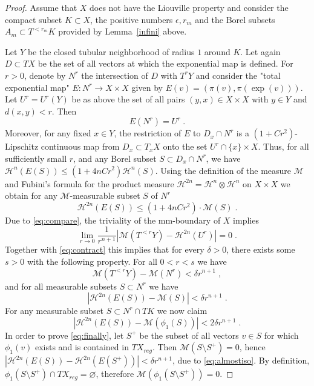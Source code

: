 \documentclass[12pt,leqno,intlimits]{amsart}
\numberwithin{equation}{section}
\theoremstyle{definition}
\theoremstyle{remark}
\newcommand{\lref}[1]{Lemma~\ref{#1}}
\def\:{\colon}
\def\emptyset{\varnothing}
\begin{document}
\begin{proof}
Assume that $X$ does not have the Liouville property and consider the compact subset $K \subset X$, the positive numbers $\epsilon, r_m$ and the Borel
subsets $A_m\subset T^{<r_m} K$ provided by \lref{infini} above.

Let $Y$ be the closed tubular neighborhood  of radius $1$ around $K$.
Let again $D\subset TX$ be the set of all vectors at which the exponential map is defined.
  For $r>0$, denote  by $N^r$ the intersection of $D$ with $T^r Y$ and consider the "total exponential map"
$E\:N^r \to X\times X$ given by $E(v)= (\pi (v), \pi (\exp (v)))$.   
Let $U^r =U^r(Y)$ be as above the set of all
  pairs $(y,x) \in X\times X$ with $y\in Y$ and $d(x,y)<r$. Then
\begin{equation} \label{eq:image}
E(N^r) =U^r \; .
\end{equation}
Moreover, for any  fixed $x \in Y$, the restriction of $E$ to $D_x \cap N^r$ is
a $(1+ C r^2)$-Lipschitz continuous map from $D_x\subset T_xX$ onto the set  $U^r \cap \{x \} \times X$.
Thus, for all sufficiently small $r$, and any Borel subset $S\subset D_x \cap N^r$, we have
$\mathcal H^n (E(S)) \leq (1+4n C r^2) \mathcal H^n (S)$.  Using the definition of the measure $\mathcal M$ and  Fubini's formula for the product measure
$\mathcal H^{2n} =\mathcal H^n \otimes \mathcal H^n $ on $X\times X$ we obtain for any $\mathcal M$-measurable subset $S$ of $N^r$
\begin{equation} \label{eq:contract}
\mathcal H^{2n} (E(S)) \leq (1+4nC r^2) \cdot \mathcal M(S)\; .
\end{equation}
Due to \eqref{eq:compare}, the triviality of the mm-boundary of $X$ implies
$$\lim _{r\to 0} \frac 1 {r^{n+1} } |\mathcal M(T^{<r} Y) -\mathcal H^{2n} (U^r)| =0 \;.$$
	Together with  \eqref{eq:contract} this implies that for every  $\delta >0$, there exists some $s>0$ with the following property. For all $0<r<s$
	we have
	\begin{equation}  \label{eq:almostall}
	\mathcal M (T^{<r} Y)- \mathcal M (N^r) < \delta r^{n+1} \; ,
	\end{equation}
	and  for all measurable subsets $S\subset N^r$ we have
	\begin{equation}  \label{eq:almostiso}
	|\mathcal H^{2n} (E(S)) - \mathcal M  (S)|  < \delta r^{n+1} \;.
\end{equation}
For any measurable subset $S\subset N^r \cap TK$  we now claim
\begin{equation} \label{eq:finally}
|\mathcal H^{2n} (E(S)) - \mathcal M (\phi _1 (S))|  <  2 \delta r^{n+1} \; .
\end{equation}
In order to prove \eqref{eq:finally}, let $S^+$ be the subset of all vectors $v\in S $ for which $\phi_1 (v)$ exists  and is contained in $TX_{reg}$.
Then $ \mathcal M (S\setminus S^+ )=0 $, hence $|\mathcal H^{2n} (E(S))- \mathcal H^{2n} (E(S^+))|< \delta r^{n+1} $, due to  \eqref{eq:almostiso}.
 By definition, $\phi _1 (S\setminus S^+)\cap TX_{reg} =\emptyset$, therefore $\mathcal M (\phi _1 (S\setminus S^+)) =0$.



\end{proof}
\end{document}
